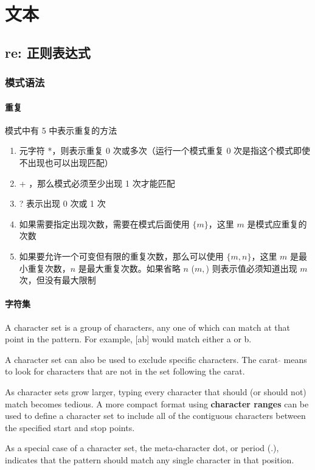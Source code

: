 \chapter{文本\label{01}}
\section{re: 正则表达式}
\subsection{模式语法}
\subsubsection{重复}
模式中有 5 中表示重复的方法
\begin{enumerate}
    \item 元字符 *，则表示重复 0 次或多次（运行一个模式重复 0 次是指这个模式即使不出现也可以出现匹配）
    \item + ，那么模式必须至少出现 1 次才能匹配
    \item ? 表示出现 0 次或 1 次
    \item 如果需要指定出现次数，需要在模式后面使用 $\{m\}$，这里 $m$ 是模式应重复的次数
    \item 如果要允许一个可变但有限的重复次数，那么可以使用 $\{m, n\}$，这里 $m$ 是最小重复次数，$n$ 是最大重复次数。如果省略 $n$ (${m, }$) 则表示值必须知道出现 $m$ 次，但没有最大限制
\end{enumerate}
\subsubsection{字符集}
A character set is a group of characters, any one of which can match at that point in the pattern. For example, [ab] would match either a or b.

A character set can also be used to exclude specific characters. The carat $\hat{}$ means to look for characters that are not in the set following the carat.

As character sets grow larger, typing every character that should (or should not) match becomes tedious. A more compact format using \textbf{character ranges} can be used to define a character set to include all of the contiguous characters between the specified start and stop points.

As a special case of a character set, the meta-character dot, or period (.), indicates that the pattern should match any single character in that position.

